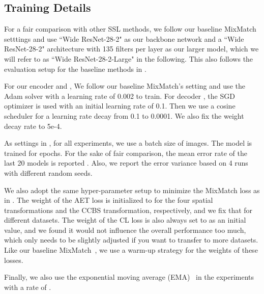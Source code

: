 \documentclass[journal]{IEEEtran}
\begin{document}
\subsection{Training Details}
For a fair comparison with other SSL methods, we follow our baseline MixMatch setttings and use ``Wide ResNet-28-2" as our backbone network and a ``Wide ResNet-28-2" architecture  with 135 filters per layer as our larger model, which we will refer to as ``Wide ResNet-28-2-Large" in the following. This also follows the evaluation setup for the baseline methods in \cite{oliver2018realistic}.

\par For our encoder  and , We follow our baseline MixMatch's setting and use the Adam solver \cite{kingma2014semi} with a learning rate of 0.002 to train. For decoder , the SGD optimizer is used  with an initial learning rate of 0.1. Then we use a cosine \cite{loshchilov2016sgdr} scheduler for a learning rate decay from 0.1 to 0.0001. We also fix the weight decay rate to 5e-4.

\par As settings in \cite{berthelot2019mixmatch}, for all experiments, we use a batch size  of  images. The model is trained for  epochs. For the sake of fair comparison,  the mean error rate of the last 20 models is reported . Also, we report the error variance based on 4 runs with different random seeds.


\par We also adopt the same hyper-parameter setup to minimize the MixMatch loss as in \cite{berthelot2019mixmatch}.
The weight  of the AET loss is initialized to  for the four spatial transformations and the CCBS transformation, respectively, and we fix that for different datasets.  The weight   of the CL loss is also always set to 
as an initial value, and we found it would not influence the overall performance too much, which only needs to be slightly adjusted if you want to transfer to more datasets.
Like our baseline MixMatch~\cite{berthelot2019mixmatch}, we use a warm-up strategy for the weights of these losses.

\par Finally, we also use the exponential moving average (EMA)~\cite{tarvainen2017mean} in the experiments with a rate of .
\end{document}
